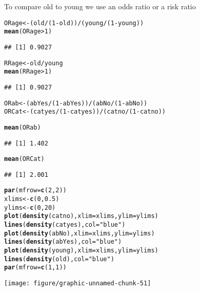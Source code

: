 \documentclass[12pt,letterpaper,oneside]{article}\usepackage{graphicx, color}
\makeatletter
\newcommand{\hlfunctioncall}[1]{\textcolor[rgb]{0.501960784313725,0,0.329411764705882}{\textbf{#1}}}%
\newcommand{\hlstring}[1]{\textcolor[rgb]{0.6,0.6,1}{#1}}%
\newenvironment{kframe}{%
 \def\at@end@of@kframe{}%
 \ifinner\ifhmode%
  \def\at@end@of@kframe{\end{minipage}}%
  \begin{minipage}{\columnwidth}%
 \fi\fi%
 \def\FrameCommand##1{\hskip\@totalleftmargin \hskip-\fboxsep
 \colorbox{shadecolor}{##1}\hskip-\fboxsep
     \hskip-\linewidth \hskip-\@totalleftmargin \hskip\columnwidth}%
 \MakeFramed {\advance\hsize-\width
   \@totalleftmargin\z@ \linewidth\hsize
   \@setminipage}}%
 {\par\unskip\endMakeFramed%
 \at@end@of@kframe}
\newenvironment{knitrout}{}{} %
\makeatother
\begin{document}
To compare old to young we use an odds ratio or a risk ratio
\begin{knitrout}\scriptsize
{}\color{fgcolor}\begin{kframe}
\begin{alltt}
ORage <- (old/(1 - old))/(young/(1 - young))
\hlfunctioncall{mean}(ORage > 1)
\end{alltt}
\begin{verbatim}
## [1] 0.9027
\end{verbatim}
\begin{alltt}

RRage <- old/young
\hlfunctioncall{mean}(RRage > 1)
\end{alltt}
\begin{verbatim}
## [1] 0.9027
\end{verbatim}
\begin{alltt}

ORab <- (abYes/(1 - abYes))/(abNo/(1 - abNo))
ORCat <- (catyes/(1 - catyes))/(catno/(1 - catno))

\hlfunctioncall{mean}(ORab)
\end{alltt}
\begin{verbatim}
## [1] 1.402
\end{verbatim}
\begin{alltt}
\hlfunctioncall{mean}(ORCat)
\end{alltt}
\begin{verbatim}
## [1] 2.001
\end{verbatim}
\begin{alltt}
\hlfunctioncall{par}(mfrow = \hlfunctioncall{c}(2, 2))
xlims <- \hlfunctioncall{c}(0, 0.5)
ylims <- \hlfunctioncall{c}(0, 20)
\hlfunctioncall{plot}(\hlfunctioncall{density}(catno), xlim = xlims, ylim = ylims)
\hlfunctioncall{lines}(\hlfunctioncall{density}(catyes), col = \hlstring{"blue"})
\hlfunctioncall{plot}(\hlfunctioncall{density}(abNo), xlim = xlims, ylim = ylims)
\hlfunctioncall{lines}(\hlfunctioncall{density}(abYes), col = \hlstring{"blue"})
\hlfunctioncall{plot}(\hlfunctioncall{density}(young), xlim = xlims, ylim = ylims)
\hlfunctioncall{lines}(\hlfunctioncall{density}(old), col = \hlstring{"blue"})
\hlfunctioncall{par}(mfrow = \hlfunctioncall{c}(1, 1))
\end{alltt}
\end{kframe}

{\centering \texttt{[image: figure/graphic-unnamed-chunk-51]} 

}



\end{knitrout}
\end{document}
